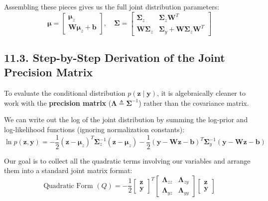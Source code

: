 \documentclass{article}
\begin{document}
Assembling these pieces gives us the full joint distribution parameters:
\begin{equation}
\boldsymbol{\mu} = \begin{bmatrix} \boldsymbol{\mu}_z \\ \mathbf{W}\boldsymbol{\mu}_z + \mathbf{b} \end{bmatrix}, \quad \boldsymbol{\Sigma} = \begin{bmatrix} \boldsymbol{\Sigma}_z & \boldsymbol{\Sigma}_z\mathbf{W}^T \\ \mathbf{W}\boldsymbol{\Sigma}_z & \boldsymbol{\Sigma}_y + \mathbf{W}\boldsymbol{\Sigma}_z\mathbf{W}^T \end{bmatrix} \tag{31}
\end{equation}

\subsection*{11.3. Step-by-Step Derivation of the Joint Precision Matrix}
To evaluate the conditional distribution $p(\mathbf{z} \mid \mathbf{y})$, it is algebraically cleaner to work with the \textbf{precision matrix} ($\boldsymbol{\Lambda} \triangleq \boldsymbol{\Sigma}^{-1}$) rather than the covariance matrix. 

We can write out the log of the joint distribution by summing the log-prior and log-likelihood functions (ignoring normalization constants):
\begin{equation*}
\ln p(\mathbf{z}, \mathbf{y}) = -\frac{1}{2}(\mathbf{z} - \boldsymbol{\mu}_z)^T \boldsymbol{\Sigma}_z^{-1}(\mathbf{z} - \boldsymbol{\mu}_z) - \frac{1}{2}(\mathbf{y} - \mathbf{W}\mathbf{z} - \mathbf{b})^T \boldsymbol{\Sigma}_y^{-1}(\mathbf{y} - \mathbf{W}\mathbf{z} - \mathbf{b})
\end{equation*}

Our goal is to collect all the quadratic terms involving our variables and arrange them into a standard joint matrix format:
\begin{equation*}
\text{Quadratic Form } (Q) = -\frac{1}{2} \begin{bmatrix} \mathbf{z} \\ \mathbf{y} \end{bmatrix}^T \begin{bmatrix} \boldsymbol{\Lambda}_{zz} & \boldsymbol{\Lambda}_{zy} \\ \boldsymbol{\Lambda}_{yz} & \boldsymbol{\Lambda}_{yy} \end{bmatrix} \begin{bmatrix} \mathbf{z} \\ \mathbf{y} \end{bmatrix}
\end{equation*}
\end{document}
